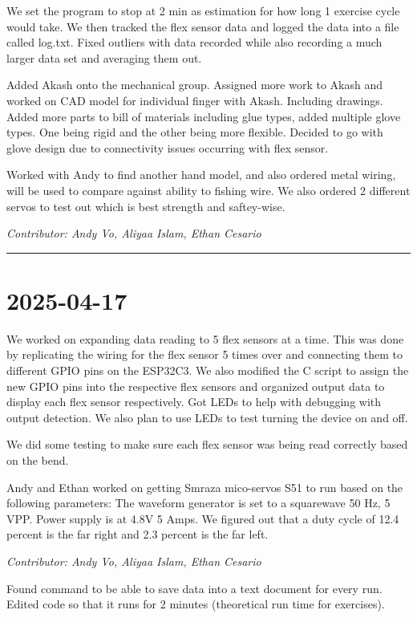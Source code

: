 \documentclass[12pt]{article}
\begin{document}
We set the program to stop at 2 min as estimation for how long 1 exercise cycle would take. We then tracked the flex sensor data and logged the data into a file called log.txt. Fixed outliers with data recorded while also recording a much larger data set and averaging them out.


Added Akash onto the mechanical group. Assigned more work to Akash and worked on CAD model for individual finger with Akash. Including drawings.
Added more parts to bill of materials including glue types, added multiple glove types. One being rigid and the other being more flexible. Decided to go with glove design due to connectivity issues occurring with flex sensor.


Worked with Andy to find another hand model, and also ordered metal wiring, will be used to compare against ability to fishing wire. We also ordered 2 different servos to test out which is best strength and saftey-wise.

\vspace{1em}
\noindent\textit{Contributor: Andy Vo, Aliyaa Islam, Ethan Cesario}
\vspace{1em}
\hrule


\section*{2025-04-17}
We worked on expanding data reading to 5 flex sensors at a time. This was done by replicating the wiring for the flex sensor 5 times over and connecting them to different GPIO pins on the ESP32C3. We also modified the C script to assign the new GPIO pins into the respective flex sensors and organized output data to display each flex sensor respectively. Got LEDs to help with debugging with output detection. We also plan to use LEDs to test turning the device on and off.


We did some testing to make sure each flex sensor was being read correctly based on the bend.


Andy and Ethan worked on getting Smraza mico-servos S51 to run based on the following parameters:
The waveform generator is set to a squarewave 50 Hz, 5 VPP. Power supply is at 4.8V 5 Amps. We figured out that a duty cycle of 12.4 percent is the far right and 2.3 percent is the far left. 

\vspace{1em}
\noindent\textit{Contributor: Andy Vo, Aliyaa Islam, Ethan Cesario}
\vspace{1em}

Found command to be able to save data into a text document for every run. Edited code so that it runs for 2 minutes (theoretical run time for exercises).
\end{document}
